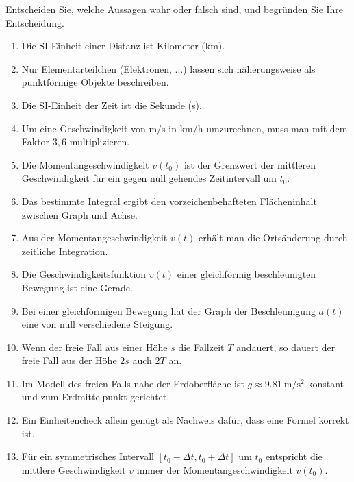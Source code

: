 \begin{ExerciseBlock}
Entscheiden Sie, welche Aussagen wahr oder falsch sind, und begründen Sie Ihre Entscheidung.
\begin{enumerate}
\item Die SI-Einheit einer Distanz ist Kilometer (km).
\item Nur Elementarteilchen (Elektronen, ...) lassen sich näherungsweise als punktförmige Objekte beschreiben.
\item Die SI-Einheit der Zeit ist die Sekunde (s).
\item Um eine Geschwindigkeit von m/s in km/h umzurechnen, muss man mit dem Faktor $3,6$ multiplizieren.
\item Die Momentangeschwindigkeit $v(t_0)$ ist der Grenzwert der mittleren Geschwindigkeit für ein gegen null gehendes Zeitintervall um $t_0$.
\item Das bestimmte Integral ergibt den vorzeichenbehafteten Flächeninhalt zwischen Graph und Achse.
\item Aus der Momentangeschwindigkeit $v(t)$ erhält man die Ortsänderung durch zeitliche Integration.
\item Die Geschwindigkeitsfunktion $v(t)$ einer gleichförmig beschleunigten Bewegung ist eine Gerade.
\item Bei einer gleichförmigen Bewegung hat der Graph der Beschleunigung $a(t)$ eine von null verschiedene Steigung.
\item Wenn der freie Fall aus einer Höhe $s$ die Fallzeit $T$ andauert, so dauert der freie Fall aus der Höhe $2s$ auch $2T$ an.
\item Im Modell des freien Falls nahe der Erdoberfläche ist $g\approx\qty{9.81}{\metre\per\second\squared}$ konstant und zum Erdmittelpunkt gerichtet.
\item Ein Einheitencheck allein genügt als Nachweis dafür, dass eine Formel korrekt ist.
\item Für ein symmetrisches Intervall $[t_0 - \Delta t, t_0 + \Delta t]$ um $t_0$ entspricht die mittlere Geschwindigkeit $\bar{v}$ immer der Momentangeschwindigkeit $v(t_0)$.
\end{enumerate}
\end{ExerciseBlock}

